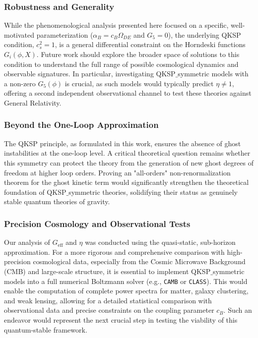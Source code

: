 \documentclass[twocolumn]{aastex631}
\begin{document}
\subsubsection{Robustness and Generality}
While the phenomenological analysis presented here focused on a specific, well-motivated parameterization ($\alpha_B = c_B \Omega_{DE}$ and $G_5=0$), the underlying QKSP condition, $c_s^2=1$, is a general differential constraint on the Horndeski functions $G_i(\phi, X)$. Future work should explore the broader space of solutions to this condition to understand the full range of possible cosmological dynamics and observable signatures. In particular, investigating QKSP\ensuremath{\_}symmetric models with a non-zero $G_5(\phi)$ is crucial, as such models would typically predict $\eta \neq 1$, offering a second independent observational channel to test these theories against General Relativity.

\subsubsection{Beyond the One-Loop Approximation}
The QKSP principle, as formulated in this work, ensures the absence of ghost instabilities at the one-loop level. A critical theoretical question remains whether this symmetry can protect the theory from the generation of new ghost degrees of freedom at higher loop orders. Proving an "all-orders" non-renormalization theorem for the ghost kinetic term would significantly strengthen the theoretical foundation of QKSP\ensuremath{\_}symmetric theories, solidifying their status as genuinely stable quantum theories of gravity.

\subsubsection{Precision Cosmology and Observational Tests}
Our analysis of $G_{\text{eff}}$ and $\eta$ was conducted using the quasi-static, sub-horizon approximation. For a more rigorous and comprehensive comparison with high-precision cosmological data, especially from the Cosmic Microwave Background (CMB) and large-scale structure, it is essential to implement QKSP\ensuremath{\_}symmetric models into a full numerical Boltzmann solver (e.g., \texttt{CAMB} or \texttt{CLASS}). This would enable the computation of complete power spectra for matter, galaxy clustering, and weak lensing, allowing for a detailed statistical comparison with observational data and precise constraints on the coupling parameter $c_B$. Such an endeavor would represent the next crucial step in testing the viability of this quantum-stable framework.
\end{document}
